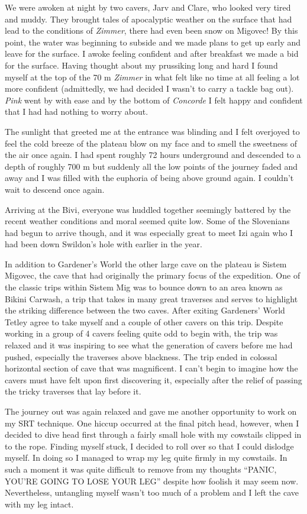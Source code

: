We were awoken at night by two cavers, Jarv and Clare, who looked very
tired and muddy. They brought tales of apocalyptic weather on the
surface that had lead to the conditions of \emph{Zimmer}, there had even
been snow on Migovec! By this point, the water was beginning to subside
and we made plans to get up early and leave for the surface. I awoke
feeling confident and after breakfast we made a bid for the surface.
Having thought about my prussiking long and hard I found myself at the
top of the 70 m \emph{Zimmer} in what felt like no time at all feeling a
lot more confident (admittedly, we had decided I wasn't to carry a
tackle bag out). \emph{Pink} went by with ease and by the bottom of
\emph{Concorde} I felt happy and confident that I had had nothing to
worry about.

The sunlight that greeted me at the entrance was blinding and I felt
overjoyed to feel the cold breeze of the plateau blow on my face and to
smell the sweetness of the air once again. I had spent roughly 72 hours
underground and descended to a depth of roughly 700 m but suddenly all
the low points of the journey faded and away and I was filled with the
euphoria of being above ground again. I couldn't wait to descend once
again.

Arriving at the Bivi, everyone was huddled together seemingly battered
by the recent weather conditions and moral seemed quite low. Some of the
Slovenians had begun to arrive though, and it was especially great to
meet Izi again who I had been down Swildon's hole with earlier in the
year.

In addition to Gardener's World the other large cave on the plateau is
Sistem Migovec, the cave that had originally the primary focus of the
expedition. One of the classic trips within Sistem Mig was to bounce
down to an area known as Bikini Carwash, a trip that takes in many great
traverses and serves to highlight the striking difference between the
two caves. After exiting Gardeners' World Tetley agree to take myself
and a couple of other cavers on this trip. Despite working in a group of
4 cavers feeling quite odd to begin with, the trip was relaxed and it
was inspiring to see what the generation of cavers before me had pushed,
especially the traverses above blackness. The trip ended in colossal
horizontal section of cave that was magnificent. I can't begin to
imagine how the cavers must have felt upon first discovering it,
especially after the relief of passing the tricky traverses that lay
before it.

The journey out was again relaxed and gave me another opportunity to
work on my SRT technique. One hiccup occurred at the final pitch head,
however, when I decided to dive head first through a fairly small hole
with my cowstails clipped in to the rope. Finding myself stuck, I
decided to roll over so that I could dislodge myself. In doing so I
managed to wrap my leg quite firmly in my cowstails. In such a moment it
was quite difficult to remove from my thoughts ``PANIC, YOU'RE GOING TO
LOSE YOUR LEG'' despite how foolish it may seem now. Nevertheless,
untangling myself wasn't too much of a problem and I left the cave with
my leg intact.


